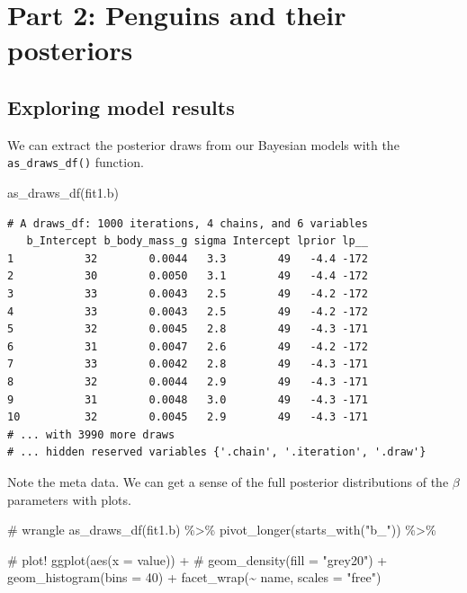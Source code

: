 \documentclass[
  letterpaper,
  DIV=11,
  numbers=noendperiod]{scrartcl}
\newenvironment{Shaded}{\begin{snugshade}}{\end{snugshade}}
\newcommand{\AttributeTok}[1]{\textcolor[rgb]{0.40,0.45,0.13}{#1}}
\newcommand{\CommentTok}[1]{\textcolor[rgb]{0.37,0.37,0.37}{#1}}
\newcommand{\DecValTok}[1]{\textcolor[rgb]{0.68,0.00,0.00}{#1}}
\newcommand{\FunctionTok}[1]{\textcolor[rgb]{0.28,0.35,0.67}{#1}}
\newcommand{\NormalTok}[1]{\textcolor[rgb]{0.00,0.23,0.31}{#1}}
\newcommand{\SpecialCharTok}[1]{\textcolor[rgb]{0.37,0.37,0.37}{#1}}
\newcommand{\StringTok}[1]{\textcolor[rgb]{0.13,0.47,0.30}{#1}}
\begin{document}
\section{Part 2: Penguins and their
posteriors}\label{part-2-penguins-and-their-posteriors}

\subsection{Exploring model results}\label{exploring-model-results}

We can extract the posterior draws from our Bayesian models with the
\texttt{as\_draws\_df()} function.

\begin{Shaded}
\begin{Highlighting}[]
\FunctionTok{as\_draws\_df}\NormalTok{(fit1.b)}
\end{Highlighting}
\end{Shaded}

\begin{verbatim}
# A draws_df: 1000 iterations, 4 chains, and 6 variables
   b_Intercept b_body_mass_g sigma Intercept lprior lp__
1           32        0.0044   3.3        49   -4.4 -172
2           30        0.0050   3.1        49   -4.4 -172
3           33        0.0043   2.5        49   -4.2 -172
4           33        0.0043   2.5        49   -4.2 -172
5           32        0.0045   2.8        49   -4.3 -171
6           31        0.0047   2.6        49   -4.2 -172
7           33        0.0042   2.8        49   -4.3 -171
8           32        0.0044   2.9        49   -4.3 -171
9           31        0.0048   3.0        49   -4.3 -171
10          32        0.0045   2.9        49   -4.3 -171
# ... with 3990 more draws
# ... hidden reserved variables {'.chain', '.iteration', '.draw'}
\end{verbatim}

Note the meta data. We can get a sense of the full posterior
distributions of the \(\beta\) parameters with plots.

\begin{Shaded}
\begin{Highlighting}[]
\CommentTok{\# wrangle}
\FunctionTok{as\_draws\_df}\NormalTok{(fit1.b) }\SpecialCharTok{\%\textgreater{}\%} 
  \FunctionTok{pivot\_longer}\NormalTok{(}\FunctionTok{starts\_with}\NormalTok{(}\StringTok{"b\_"}\NormalTok{)) }\SpecialCharTok{\%\textgreater{}\%} 
  
  \CommentTok{\# plot!}
  \FunctionTok{ggplot}\NormalTok{(}\FunctionTok{aes}\NormalTok{(}\AttributeTok{x =}\NormalTok{ value)) }\SpecialCharTok{+} 
  \CommentTok{\# geom\_density(fill = "grey20") +}
  \FunctionTok{geom\_histogram}\NormalTok{(}\AttributeTok{bins =} \DecValTok{40}\NormalTok{) }\SpecialCharTok{+}
  \FunctionTok{facet\_wrap}\NormalTok{(}\SpecialCharTok{\textasciitilde{}}\NormalTok{ name, }\AttributeTok{scales =} \StringTok{"free"}\NormalTok{)}
\end{Highlighting}
\end{Shaded}
\end{document}
